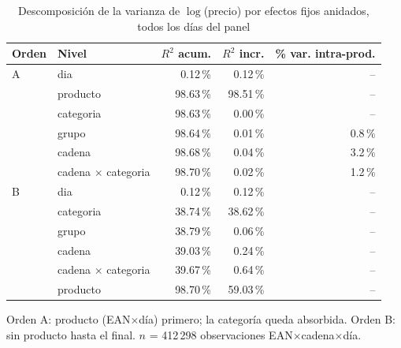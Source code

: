 \begin{table}[htbp]
\caption{Descomposici\'on de la varianza de $\log$(precio) por efectos fijos anidados, todos los d\'ias del panel}
\label{tab:varianza}
\centering\scriptsize\setlength{\tabcolsep}{3pt}
\begin{tabular}{@{}llrrr@{}}
\toprule
Orden & Nivel & $R^2$ acum. & $R^2$ incr. & \% var. intra-prod. \\
\midrule
A & dia & 0.12\,\% & 0.12\,\% & -- \\
 & producto & 98.63\,\% & 98.51\,\% & -- \\
 & categoria & 98.63\,\% & 0.00\,\% & -- \\
 & grupo & 98.64\,\% & 0.01\,\% & 0.8\,\% \\
 & cadena & 98.68\,\% & 0.04\,\% & 3.2\,\% \\
 & cadena $\times$ categoria & 98.70\,\% & 0.02\,\% & 1.2\,\% \\
\midrule
B & dia & 0.12\,\% & 0.12\,\% & -- \\
 & categoria & 38.74\,\% & 38.62\,\% & -- \\
 & grupo & 38.79\,\% & 0.06\,\% & -- \\
 & cadena & 39.03\,\% & 0.24\,\% & -- \\
 & cadena $\times$ categoria & 39.67\,\% & 0.64\,\% & -- \\
 & producto & 98.70\,\% & 59.03\,\% & -- \\
\bottomrule\end{tabular}
\par\smallskip\raggedright\scriptsize Orden A: producto (EAN$\times$d\'ia) primero; la categor\'ia queda absorbida. Orden B: sin producto hasta el final. $n$ = 412\,298 observaciones EAN$\times$cadena$\times$d\'ia.
\end{table}
